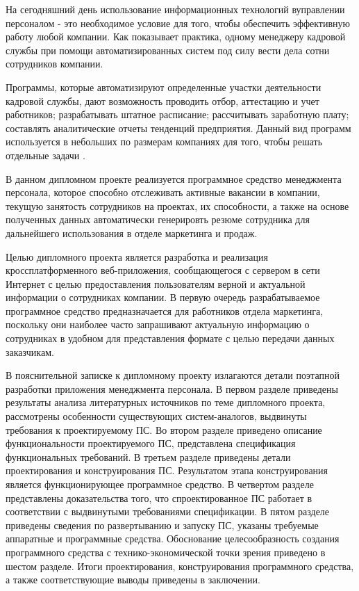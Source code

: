 На сегодняшний день использование информационных технологий вуправлении персоналом - это необходимое условие для
того, чтобы обеспечить эффективную работу любой компании. Как показывает практика, одному менеджеру кадровой службы
при помощи автоматизированных систем под силу вести дела сотни сотрудников компании.

Программы, которые автоматизируют определенные участки деятельности кадровой службы, дают возможность проводить
отбор, аттестацию и учет работников; разрабатывать штатное расписание; рассчитывать заработную плату; составлять
аналитические отчеты тенденций предприятия. Данный вид программ используется в небольших по размерам компаниях
для того, чтобы решать отдельные задачи \cite{cyberleninka}.

В данном дипломном проекте реализуется программное средство менеджмента персонала, которое способно отслеживать
активные вакансии в компании, текущую занятость сотрудников на проектах, их способности, а также на основе полученных
данных автоматически генерировть резюме сотрудника для дальнейшего использования в отделе маркетинга и продаж.

Целью дипломного проекта является разработка и реализация кроссплатформенного веб-приложения, сообщающегося с сервером
в сети Интернет с целью предоставления пользователям верной и актуальной информации о сотрудниках компании. В первую
очередь разрабатываемое программное средство предназначается для работников отдела маркетинга, поскольку они наиболее
часто запрашивают актуальную информацию о сотрудниках в удобном для представления формате с целью передачи данных заказчикам.

В пояснительной записке к дипломному проекту излагаются детали поэтапной разработки приложения менеджмента персонала.
В первом разделе приведены результаты анализа литературных источников по теме дипломного проекта, рассмотрены
особенности существующих систем-аналогов, выдвинуты требования к проектируемому ПС. Во втором разделе приведено
описание функциональности проектируемого ПС, представлена спецификация функциональных требований. В третьем
разделе приведены детали проектирования и конструирования ПС. Результатом этапа конструирования является функционирующее
программное средство. В четвертом разделе представлены доказательства того, что спроектированное ПС работает в
соответствии с выдвинутыми требованиями спецификации. В пятом разделе приведены сведения по развертыванию и запуску ПС,
указаны требуемые аппаратные и программные средства. Обоснование целесообразность создания программного средства с
технико-экономической точки зрения приведено в шестом разделе. Итоги проектирования, конструирования программного
средства, а также соответствующие выводы приведены в заключении.

